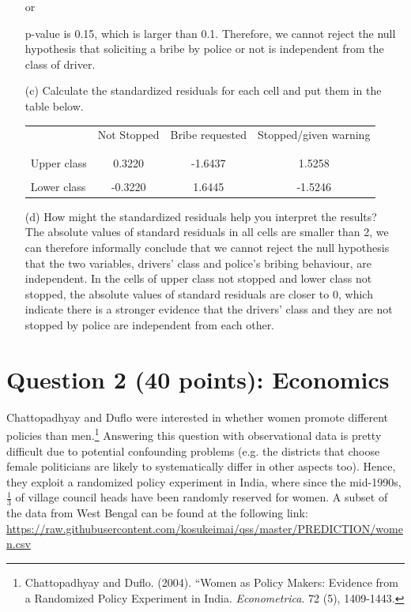 \documentclass[12pt,letterpaper]{article}
\begin{document}
\begin{enumerate}
	
	or
	
	p-value is 0.15, which is larger than 0.1. Therefore, we cannot reject the null hypothesis that soliciting a bribe by police or not is independent from the class of driver.
	\newpage
	\item [(c)] Calculate the standardized residuals for each cell and put them in the table below.
	\vspace{1cm}
	
	
	
	\begin{table}[h]
		\centering
		\begin{tabular}{l | c c c }
			& Not Stopped & Bribe requested & Stopped/given warning \\
			\\[-1.8ex] 
			\hline \\[-1.8ex]
			Upper class  & 0.3220 & -1.6437 & 1.5258 \\
			\\
			Lower class & -0.3220 & 1.6445  & -1.5246  \\
			
		\end{tabular}
	\end{table}
	
	
	\vspace{7cm}
	\item [(d)] How might the standardized residuals help you interpret the results?  \\
	 The absolute values of standard residuals in all cells are smaller than 2, we can therefore informally conclude that we cannot reject the null hypothesis that the two variables, drivers' class and police's bribing behaviour, are independent. In the cells of upper class not stopped and lower class not stopped, the absolute values of standard residuals are closer to 0, which indicate there is a stronger evidence that the drivers' class and they are not stopped by police are independent from each other. 
	
	
\end{enumerate}
\newpage

\section*{Question 2 (40 points): Economics}
Chattopadhyay and Duflo were interested in whether women promote different policies than men.\footnote{Chattopadhyay and Duflo. (2004). ``Women as Policy Makers: Evidence from a Randomized Policy Experiment in India. \textit{Econometrica}. 72 (5), 1409-1443.} Answering this question with observational data is pretty difficult due to potential confounding problems (e.g. the districts that choose female politicians are likely to systematically differ in other aspects too). Hence, they exploit a randomized policy experiment in India, where since the mid-1990s, $\frac{1}{3}$ of village council heads have been randomly reserved for women. A subset of the data from West Bengal can be found at the following link: \url{https://raw.githubusercontent.com/kosukeimai/qss/master/PREDICTION/women.csv}\\
\end{document}
